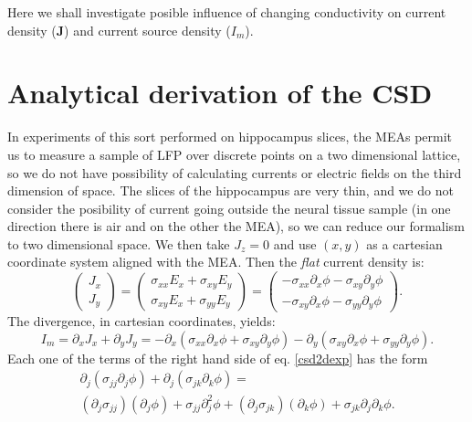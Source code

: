 \documentclass{article}
\newcommand{\Jd}{\mathbf{J}}
\begin{document}
Here we shall investigate
posible influence of changing conductivity on current density
($\Jd$) and current source density ($I_m$). 


\section{Analytical  derivation of the CSD}


In experiments of this sort performed on hippocampus slices, the
MEAs permit us to measure a sample of LFP over discrete points on a
two dimensional lattice, so we do not have possibility of
calculating currents or electric fields on the third dimension of space.
The slices of the hippocampus are very thin, and we do not consider
the posibility of current going outside the neural tissue sample (in one
direction there is air and on the other the MEA), so we
can reduce our formalism to two dimensional space. We then take
$J_z=0$ and use $(x,y)$ as a cartesian coordinate system aligned
with the MEA. Then the \emph{flat} current density  is:
\begin{equation}
  \begin{pmatrix}
    J_x\\
    J_y
  \end{pmatrix}  =
  \begin{pmatrix}
    \sigma_{xx}E_x+\sigma_{xy}E_y \\
    \sigma_{xy}E_x+\sigma_{yy}E_y 
  \end{pmatrix}=
  \begin{pmatrix}
    -\sigma_{xx}\partial_x \phi -\sigma_{xy}\partial_y \phi \\
    -\sigma_{xy}\partial_x \phi -\sigma_{yy}\partial_y \phi 
  \end{pmatrix}.
\end{equation}
The divergence, in cartesian coordinates, yields:
\begin{equation}\label{csd2dexp}
  I_m=\partial_x J_x+\partial_y J_y=
  -\partial_x( \sigma_{xx}\partial_x \phi +\sigma_{xy}\partial_y \phi)
  -\partial_y( \sigma_{xy}\partial_x \phi +\sigma_{yy}\partial_y \phi). 
\end{equation}
Each one of the terms of the right hand side of eq. \ref{csd2dexp}
has the form
\begin{multline}
  \partial_j (\sigma_{jj}\partial_j\phi) +\partial_j (\sigma_{jk}\partial_k \phi)
  =  \\
  (\partial_j \sigma_{jj})(\partial_j\phi) +\sigma_{jj}\partial_j^2\phi +
  (\partial_j \sigma_{jk})(\partial_k \phi)+\sigma _{jk}\partial_j\partial_k \phi.
\end{multline}
\end{document}
